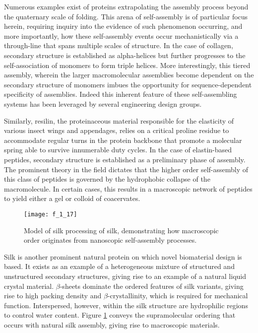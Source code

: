 \begin{refsection}

Numerous examples exist of proteins extrapolating the assembly process beyond
the quaternary scale of folding. This arena of self-assembly is of particular
focus herein, requiring inquiry into the evidence of such phenomenon occurring,
and more importantly, how these self-assembly events occur mechanistically via a
through-line that spans multiple scales of structure. In the case of collagen,
secondary structure is established as alpha-helices but further progresses to
the self-association of monomers to form triple helices.  More interestingly,
this tiered assembly, wherein the larger macromolecular assemblies become
dependent on the secondary structure of monomers imbues the opportunity for
sequence-dependent specificity of assemblies. Indeed this inherent feature of
these self-assembling systems has been leveraged by several engineering design
groups.\cite{Kar2009,Stahl2010a,Fletcher2012}

Similarly, resilin, the proteinaceous material responsible for the elasticity of
various insect wings and appendages, relies on a critical proline residue to
accommodate regular turns in the protein backbone that promote a molecular
spring able to survive innumerable duty cycles.\cite{Rauscher2006} In the case
of elastin-based peptides, secondary structure is established as a preliminary
phase of assembly. The prominent theory in the field dictates that the higher
order self-assembly of this class of peptides is governed by the hydrophobic
collapse of the macromolecule. In certain cases, this results in a macroscopic
network of peptides to yield either a gel or colloid of
coacervates.\cite{Urry1991,Li2002a,Li2001,Urry1986,Urry1988}
\begin{figure}[h!] \centering \texttt{[image: f\_1\_17]}
    \caption[Model of silk processing]{Model of silk processing of
         silk, demonstrating how macroscopic order originates
        from nanoscopic self-assembly processes.\cite{Jin2003}}\label{fig:silk_structure} \end{figure}
Silk is another prominent natural protein on which novel biomaterial design is
based. It exists as an example of a heterogeneous mixture of structured and
unstructured secondary structures, giving rise to an example of a natural liquid
crystal material. $\beta$-sheets dominate the ordered features of silk variants,
giving rise to high packing density and ${\beta}$-crystallinity, which is
required for mechanical function. Interspersed, however, within the silk
structure are hydrophilic regions to control water
content.\cite{Bini2004a,Jin2003,Knight2002} Figure \ref{fig:silk_structure}
conveys the supramolecular ordering that occurs with natural silk assembly,
giving rise to macroscopic materials.


\end{refsection}

